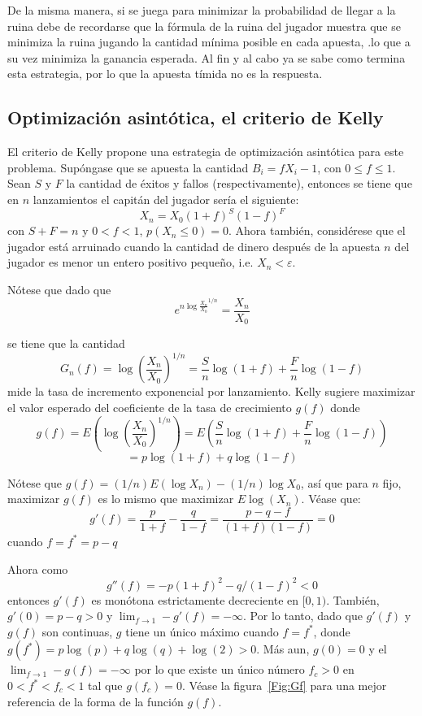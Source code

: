 De la misma manera, si se juega para minimizar la probabilidad de llegar a la ruina debe de recordarse que la fórmula de la ruina del jugador muestra que se minimiza la ruina jugando la cantidad mínima posible en cada apuesta, .lo que a su vez minimiza la ganancia esperada. Al fin y al cabo ya se sabe como termina esta estrategia, por lo que la apuesta tímida no es la respuesta.
\subsection{Optimización asintótica, el criterio de Kelly}
El criterio de Kelly \cite{kelly1956new} propone una estrategia de optimización asintótica para este problema. Supóngase que se apuesta la cantidad $B_i = fX_i-1$, con $0 \leqslant f \leqslant 1$. Sean $S$ y $F$ la cantidad de éxitos y fallos (respectivamente), entonces se tiene que en $n$ lanzamientos el capitán del jugador sería el siguiente:
\[X_n = X_0(1+f)^S(1-f)^F\] con $S + F = n$ y $0<f<1$, $p(X_n \leqslant 0) = 0 $. 
Ahora también, considérese que el jugador está arruinado cuando la cantidad de dinero después de la apuesta $n$ del jugador es menor un entero positivo pequeño, i.e. $X_n < \varepsilon$.

Nótese que dado que
\[e^{n \log{\frac{X_n}{X_0}^{1/n}}} = \frac{X_n}{X_0}\]

se tiene que la cantidad
\[G_n(f) = \log{\left(\frac{X_n}{X_0}\right)^{1/n}} = \frac{S}{n}\log(1+f) + \frac{F}{n}\log(1-f)\]
mide la tasa de incremento exponencial por lanzamiento. Kelly sugiere maximizar el valor esperado del coeficiente de la tasa de crecimiento $g(f)$ donde
\[g(f) = E\left(\log\left(\frac{X_n}{X_0}\right)^{1/n}\right) = E\left({\frac{S}{n}\log(1+f) + \frac{F}{n}\log(1-f)}\right)\]
\[=p\log(1+f)+q\log(1-f)\]

Nótese que $g(f) = (1/n)E(\log{X_n})-(1/n)\log{X_0}$, así que para $n$ fijo, maximizar $g(f)$ es lo mismo que maximizar $E \log(X_n)$. Véase que:
\[g'(f) = \frac{p}{1+f} - \frac{q}{1-f} = \frac{p-q-f}{(1+f)(1-f)} = 0\]
cuando $f=f^* = p-q$

Ahora como
\[g''(f) = -p(1+f)^2 - q/(1-f)^2 < 0\]
 entonces $g'(f)$ es monótona estrictamente decreciente en $[0,1)$. También, $g'(0) =p -q >0$ y $\lim_{f\to1}-g'(f)=-\infty$. Por lo tanto, dado que $g'(f)$ y $g(f)$ son continuas, $g$ tiene un único máximo cuando $f=f^*$, donde $g(f^*) = p\log(p) + q\log(q) +\log(2) >0$. Más aun, $g(0)= 0$ y el $\lim_{f\to1}-g(f)=-\infty$ por lo que existe un único número $f_c>0$ en $0 < f^* < f_c < 1$ tal que $g(f_c)=0$. Véase la figura~\ref{Fig:Gf} para una mejor referencia de la forma de la función $g(f)$.
 
